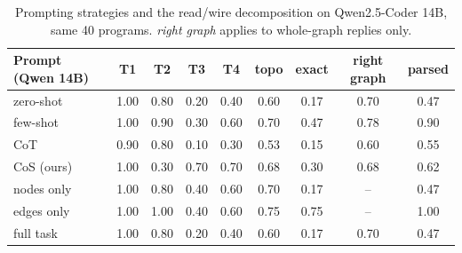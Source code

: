 \begin{table}[!h]
\centering
\small
\begin{tabular}{lcccccccc}
\hline
Prompt (Qwen 14B) & T1 & T2 & T3 & T4 & topo & exact & right graph & parsed \\
\hline
zero-shot & 1.00 & 0.80 & 0.20 & 0.40 & 0.60 & 0.17 & 0.70 & 0.47 \\
few-shot & 1.00 & 0.90 & 0.30 & 0.60 & 0.70 & 0.47 & 0.78 & 0.90 \\
CoT & 0.90 & 0.80 & 0.10 & 0.30 & 0.53 & 0.15 & 0.60 & 0.55 \\
CoS (ours) & 1.00 & 0.30 & 0.70 & 0.70 & 0.68 & 0.30 & 0.68 & 0.62 \\
nodes only & 1.00 & 0.80 & 0.40 & 0.60 & 0.70 & 0.17 & -- & 0.47 \\
edges only & 1.00 & 1.00 & 0.40 & 0.60 & 0.75 & 0.75 & -- & 1.00 \\
full task & 1.00 & 0.80 & 0.20 & 0.40 & 0.60 & 0.17 & 0.70 & 0.47 \\
\hline
\end{tabular}
\caption{Prompting strategies and the read/wire decomposition on Qwen2.5-Coder 14B, same 40 programs. \emph{right graph} applies to whole-graph replies only.}\label{tab:prompts}
\end{table}
